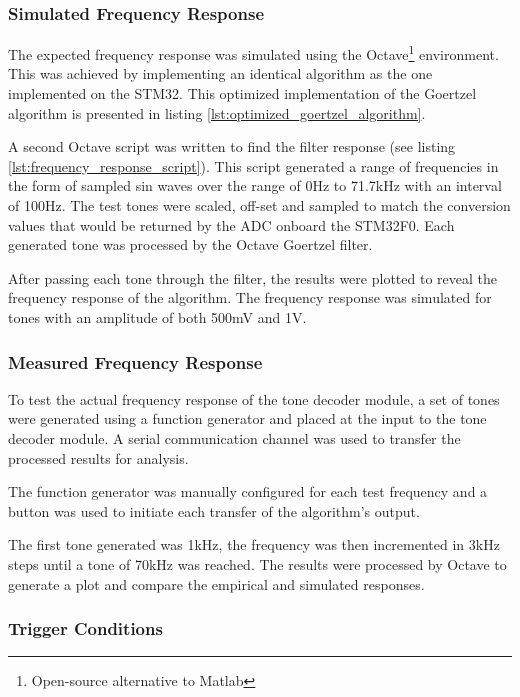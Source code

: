 \subsubsection{Simulated Frequency Response}
The expected frequency response was simulated using the Octave\footnote{Open-source alternative to Matlab} environment. This was achieved by implementing an identical algorithm as the one implemented on the STM32. This optimized implementation of the Goertzel algorithm is presented in listing \ref{lst:optimized_goertzel_algorithm}.

A second Octave script was written to find the filter response (see listing \ref{lst:frequency_response_script}). This script generated a range of frequencies in the form of sampled sin waves over the range of 0Hz to 71.7kHz with an interval of 100Hz. The test tones were scaled, off-set and sampled to match the conversion values that would be returned by the ADC onboard the STM32F0. Each generated tone was processed by the Octave Goertzel filter.

After passing each tone through the filter, the results were plotted to reveal the frequency response of the algorithm. The frequency response was simulated for tones with an amplitude of both 500mV and 1V.

\subsubsection{Measured Frequency Response}

To test the actual frequency response of the tone decoder module, a set of tones were generated using a function generator and placed at the input to the tone decoder module. A serial communication channel was used to transfer the processed results for analysis.

The function generator was manually configured for each test frequency and a button was used to initiate each transfer of the algorithm's output.

The first tone generated was 1kHz, the frequency was then incremented in 3kHz steps until a tone of 70kHz was reached. The results were processed by Octave to generate a plot and compare the empirical and simulated responses.


\subsubsection{Trigger Conditions}

